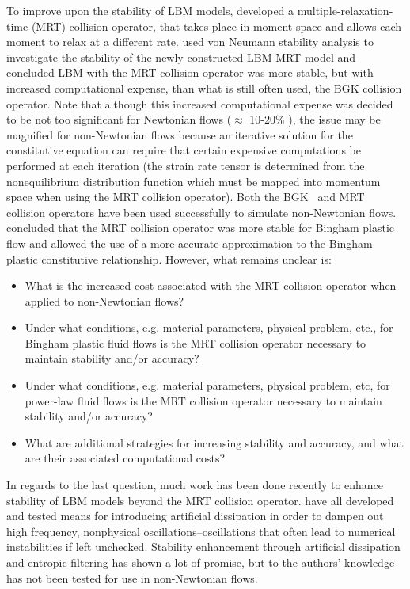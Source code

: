 \documentclass[pdftex,ms]{pittetd}
\begin{document}
To improve upon the stability of LBM models, \citet{d1994generalized} developed a multiple-relaxation-time (MRT) collision operator, that takes place in moment space and allows each moment to relax at a different rate.
\citet{lallemand2000theory} used von Neumann stability analysis to investigate the stability of the newly constructed LBM-MRT model and concluded LBM with the MRT collision operator was more stable, but with increased computational expense, than what is still often used, the BGK collision operator.
Note that although this increased computational expense was decided to be not too significant for Newtonian flows ($\approx$ 10-20\% \cite{lallemand2000theory}), the issue may be magnified for non-Newtonian flows because an iterative solution for the constitutive equation can require that certain expensive computations be performed at each iteration (the strain rate tensor is determined from the nonequilibrium distribution function which must be mapped into momentum space when using the MRT collision operator).
Both the BGK~\cite{wang2011lattice,ashrafizaadeh2009comparison,wang2015localized,tang2011bingham} and MRT~\cite{chen2014simulations,fallah2012multiple,chai2011multiple} collision operators have been used successfully to simulate non-Newtonian flows.
\citeauthor{chen2014simulations} concluded that the MRT collision operator was more stable for Bingham plastic flow and allowed the use of a more accurate approximation to the Bingham plastic constitutive relationship.
However, what remains unclear is:
\begin{itemize}
    \item What is the increased cost associated with the MRT collision operator when applied to non-Newtonian flows?
    \item Under what conditions, e.g. material parameters, physical problem, etc., for Bingham plastic fluid flows is the MRT collision operator necessary to maintain stability and/or accuracy?
    \item Under what conditions, e.g. material parameters, physical problem, etc, for power-law fluid flows is the MRT collision operator necessary to maintain stability and/or accuracy?
    \item What are additional strategies for increasing stability and accuracy, and what are their associated computational costs?
\end{itemize}
In regards to the last question, much work has been done recently to enhance stability of LBM models beyond the MRT collision operator.
\citet{brownlee2006stabilization,brownlee2007stability,brownlee2008nonequilibrium,packwood2009entropy,gorban2014enhancement} have all developed and tested means for introducing artificial dissipation in order to dampen out high frequency, nonphysical oscillations--oscillations that often lead to numerical instabilities if left unchecked.
Stability enhancement through artificial dissipation and entropic filtering has shown a lot of promise, but to the authors' knowledge has not been tested for use in non-Newtonian flows.
\end{document}
